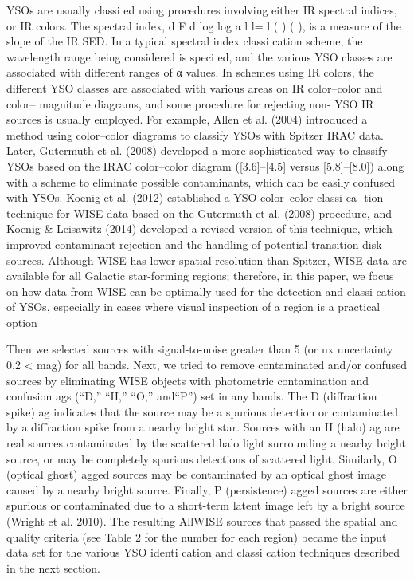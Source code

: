 \documentclass[../Main.tex]{subfiles}
\begin{document}
{YSOs are usually classi ed using procedures involving
either IR spectral indices, or IR colors. The spectral index,
d F d log log a l l= l ( ) ( ), is a measure of the slope of the IR
SED. In a typical spectral index classi cation scheme, the
wavelength range being considered is speci ed, and the various
YSO classes are associated with different ranges of α values. In
schemes using IR colors, the different YSO classes are
associated with various areas on IR color–color and color–
magnitude diagrams, and some procedure for rejecting non-
YSO IR sources is usually employed. For example, Allen et al.
(2004) introduced a method using color–color diagrams to
classify YSOs with Spitzer IRAC data. Later, Gutermuth et al.
(2008) developed a more sophisticated way to classify YSOs
based on the IRAC color–color diagram ([3.6]–[4.5] versus
[5.8]–[8.0]) along with a scheme to eliminate possible
contaminants, which can be easily confused with YSOs.
Koenig et al. (2012) established a YSO color–color classi ca-
tion technique for WISE data based on the Gutermuth et al.
(2008) procedure, and Koenig & Leisawitz (2014) developed a
revised version of this technique, which improved contaminant
rejection and the handling of potential transition disk sources.
Although WISE has lower spatial resolution than Spitzer,
WISE data are available for all Galactic star-forming regions;
therefore, in this paper, we focus on how data from WISE can be
optimally used for the detection and classi cation of YSOs,
especially in cases where visual inspection of a region is a
practical option

Then we selected sources with signal-to-noise
greater than 5 (or ux uncertainty 0.2
< mag) for all bands. Next,
we tried to remove contaminated and/or confused sources by
eliminating WISE objects with photometric contamination and
confusion ags (“D,” “H,” “O,” and“P”) set in any bands. The D
(diffraction spike) ag indicates that the source may be a spurious
detection or contaminated by a diffraction spike from a nearby
bright star. Sources with an H (halo) ag are real sources
contaminated by the scattered halo light surrounding a nearby
bright source, or may be completely spurious detections of
scattered light. Similarly, O (optical ghost) agged sources may
be contaminated by an optical ghost image caused by a nearby
bright source. Finally, P (persistence) agged sources are either
spurious or contaminated due to a short-term latent image left by a
bright source (Wright et al. 2010). The resulting AllWISE sources
that passed the spatial and quality criteria (see Table 2 for the
number for each region) became the input data set for the various
YSO identi cation and classi cation techniques described in the
next section.

}
\end{document}
